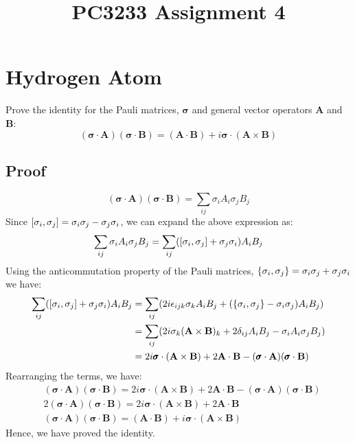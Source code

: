 \documentclass[11pt]{article}
\title{PC3233 Assignment 4}
\begin{document}
    
    \maketitle
    
    \section{Hydrogen Atom}
    Prove the identity for the Pauli matrices, $\pmb{\sigma}$ and general vector operators $\mathbf{A}$ and $\mathbf{B}$:
    \begin{equation}
    (\pmb{\sigma} \cdot \mathbf{A})  (\pmb{\sigma} \cdot \mathbf{B}) = (\mathbf{A} \cdot \mathbf{B}) + i\pmb{\sigma} \cdot (\mathbf{A} \times \mathbf{B})
    \end{equation}

    \subsection{Proof}
    \begin{equation}
        (\pmb{\sigma} \cdot \mathbf{A})  (\pmb{\sigma} \cdot \mathbf{B}) = \sum_{ij} \sigma_i A_i \sigma_j B_j
    \end{equation}
    Since $\commutator{\sigma_i}{\sigma_j} = \sigma_i \sigma_j - \sigma_j \sigma_i$, we can expand the above expression as:
    \begin{equation}
        \sum_{ij} \sigma_i A_i \sigma_j B_j = \sum_{ij} (\commutator{\sigma_i}{\sigma_j} + \sigma_j \sigma_i) A_i B_j
    \end{equation}
    Using the anticommutation property of the Pauli matrices, $\anticommutator{\sigma_i}{\sigma_j} = \sigma_i \sigma_j + \sigma_j \sigma_i$ we have:
    \begin{align*}
        \sum_{ij} (\commutator{\sigma_i}{\sigma_j} + \sigma_j \sigma_i) A_i B_j 
        &= \sum_{ij}( 2 i \epsilon_{ijk} \sigma_k A_i B_j + (\anticommutator{\sigma_i}{\sigma_j} - \sigma_i \sigma_j) A_i B_j) \\
        &= \sum_{ij} (2 i \sigma_k (\mathbf{A} \times \mathbf{B})_k + 2 \delta_{ij} A_i B_j - \sigma_i A_i \sigma_j B_j) \\
        &= 2 i \pmb{\sigma} \cdot (\mathbf{A} \times \mathbf{B}) + 2 \mathbf{A} \cdot \mathbf{B} - (\pmb{\sigma} \cdot \mathbf{A}) (\pmb{\sigma} \cdot \mathbf{B}) \\
    \end{align*}
    Rearranging the terms, we have:
    \begin{align*}
        & (\pmb{\sigma} \cdot \mathbf{A})  (\pmb{\sigma} \cdot \mathbf{B}) = 2 i \pmb{\sigma} \cdot (\mathbf{A} \times \mathbf{B}) + 2 \mathbf{A} \cdot \mathbf{B} - (\pmb{\sigma} \cdot \mathbf{A}) (\pmb{\sigma} \cdot \mathbf{B}) \\
        & 2 (\pmb{\sigma} \cdot \mathbf{A})  (\pmb{\sigma} \cdot \mathbf{B}) = 2 i \pmb{\sigma} \cdot (\mathbf{A} \times \mathbf{B}) + 2 \mathbf{A} \cdot \mathbf{B} \\
        & (\pmb{\sigma} \cdot \mathbf{A})  (\pmb{\sigma} \cdot \mathbf{B}) = (\mathbf{A} \cdot \mathbf{B}) + i\pmb{\sigma} \cdot (\mathbf{A} \times \mathbf{B})
    \end{align*}
    Hence, we have proved the identity.
\end{document}
